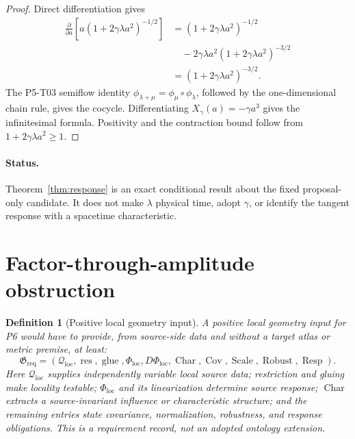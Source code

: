 \documentclass[11pt]{article}
\newtheorem{definition}{Definition}
\begin{document}
\begin{proof}
Direct differentiation gives
\[
\begin{aligned}
\frac{\partial}{\partial a}
\left[a(1+2\gamma\lambda a^2)^{-1/2}\right]
&=(1+2\gamma\lambda a^2)^{-1/2}\\
&\quad-2\gamma\lambda a^2
 (1+2\gamma\lambda a^2)^{-3/2}\\
&=(1+2\gamma\lambda a^2)^{-3/2}.
\end{aligned}
\]
The P5-T03 semiflow identity
\(\phi_{\lambda+\mu}=\phi_\mu\circ\phi_\lambda\), followed by the
one-dimensional chain rule, gives the cocycle.  Differentiating
\(X_\gamma(a)=-\gamma a^3\) gives the infinitesimal formula.  Positivity and
the contraction bound follow from
\(1+2\gamma\lambda a^2\geq1\).
\end{proof}

\paragraph{Status.}
Theorem~\ref{thm:response} is an exact conditional result about the fixed
proposal-only candidate.  It does not make \(\lambda\) physical time, adopt
\(\gamma\), or identify the tangent response with a spacetime
characteristic.

\section{Factor-through-amplitude obstruction}

\begin{definition}[Positive local geometry input]
A positive local geometry input for P6 would have to provide, from source-side
data and without a target atlas or metric premise, at least:
\[
\mathfrak G_{\mathrm{req}}=
(\mathcal Q_{\mathrm{loc}},\operatorname{res},\operatorname{glue},
\Phi_{\mathrm{loc}},D\Phi_{\mathrm{loc}},
\operatorname{Char},\operatorname{Cov},\operatorname{Scale},
\operatorname{Robust},\operatorname{Resp}).
\]
Here \(\mathcal Q_{\mathrm{loc}}\) supplies independently variable local
source data; restriction and gluing make locality testable;
\(\Phi_{\mathrm{loc}}\) and its linearization determine source response;
\(\operatorname{Char}\) extracts a source-invariant influence or
characteristic structure; and the remaining entries state covariance,
normalization, robustness, and response obligations.  This is a requirement
record, not an adopted ontology extension.
\end{definition}
\end{document}
